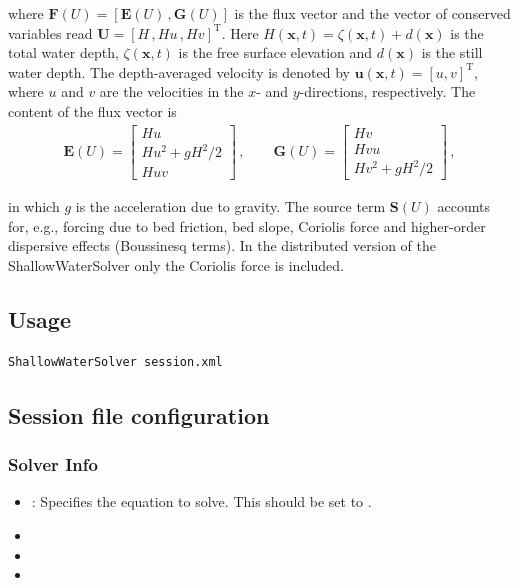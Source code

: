 where $\mathbf F(U) = \left[{\mathbf E(U)}\,, {\mathbf G(U)} \right]$ is the
flux vector and the vector of conserved variables read
${\mathbf U}=\left[H\,,Hu\,,Hv \right]^{\mathrm{T}}$. Here 
$H({\mathbf x},t)=\zeta({\mathbf x},t) + d({\mathbf x})$ is the total
water depth, $\zeta({\mathbf x},t)$ is the free surface elevation and
$d({\mathbf x})$ is the still water depth. The depth-averaged velocity
is denoted by ${\mathbf u}({\mathbf x},t) = \left[u,v\right]^{\mathrm{T}}$,
where $u$ and $v$ are the velocities in the $x$- and
$y$-directions, respectively. The content of the flux vector is
\begin{align*}
{\mathbf E(U)} = \left[ \begin{array}{c} Hu\\Hu^2 +
gH^2/2\\Huv\end{array}\right]\,, \qquad {\mathbf G(U)} = \left[
\begin{array}{c} Hv\\Hvu\\Hv^2 + gH^2/2\end{array}\right]\,,
\end{align*}

in which $g$ is the acceleration due to gravity. The source term
${\mathbf S(U)}$ accounts for, e.g., forcing due to bed
friction, bed slope, Coriolis force and higher-order dispersive effects 
(Boussinesq terms). In the distributed version of the ShallowWaterSolver
only the Coriolis force is included. 

\subsection{Usage}
\begin{lstlisting}[style=BashInputStyle]
ShallowWaterSolver session.xml
\end{lstlisting}

\subsection{Session file configuration}

\subsubsection{Solver Info}
\begin{itemize}
\item {}: Specifies the equation to solve. This should be set
to .
\item {}
\item {}
\item {}
\end{itemize}

